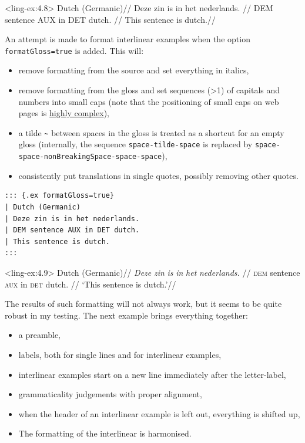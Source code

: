 \documentclass[
]{article}
\providecommand{\tightlist}{%
  \setlength{\itemsep}{0pt}\setlength{\parskip}{0pt}}
\begin{document}
\ex[*=]<ling-ex:4.8> 
  \begingl
  \glpreamble Dutch (Germanic)//
  \gla Deze zin is in het nederlands. //
  \glb DEM sentence AUX in DET dutch. //
  \glft This sentence is dutch.//
  \endgl
\xe

An attempt is made to format interlinear examples when the option
\texttt{formatGloss=true} is added. This will:

\begin{itemize}
\tightlist
\item
  remove formatting from the source and set everything in italics,
\item
  remove formatting from the gloss and set sequences (\textgreater1) of
  capitals and numbers into small caps (note that the positioning of
  small caps on web pages is
  \href{https://iamvdo.me/en/blog/css-font-metrics-line-height-and-vertical-align}{highly
  complex}),
\item
  a tilde \texttt{\textasciitilde{}} between spaces in the gloss is
  treated as a shortcut for an empty gloss (internally, the sequence
  \texttt{space-tilde-space} is replaced by
  \texttt{space-space-nonBreakingSpace-space-space}),
\item
  consistently put translations in single quotes, possibly removing
  other quotes.
\end{itemize}

\begin{verbatim}
::: {.ex formatGloss=true}
| Dutch (Germanic)
| Deze zin is in het nederlands.
| DEM sentence AUX in DET dutch.
| This sentence is dutch.
:::
\end{verbatim}

\ex[*=]<ling-ex:4.9> 
  \begingl
  \glpreamble Dutch (Germanic)//
  \gla \emph{Deze} \emph{zin} \emph{is} \emph{in} \emph{het}
\emph{nederlands.} //
  \glb \textsc{dem} sentence \textsc{aux} in \textsc{det} dutch. //
  \glft `This sentence is dutch.'//
  \endgl
\xe

The results of such formatting will not always work, but it seems to be
quite robust in my testing. The next example brings everything together:

\begin{itemize}
\tightlist
\item
  a preamble,
\item
  labels, both for single lines and for interlinear examples,
\item
  interlinear examples start on a new line immediately after the
  letter-label,
\item
  grammaticality judgements with proper alignment,
\item
  when the header of an interlinear example is left out, everything is
  shifted up,
\item
  The formatting of the interlinear is harmonised.
\end{itemize}
\end{document}
